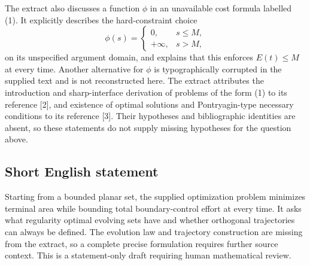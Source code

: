 \documentclass[11pt]{article}
\begin{document}
The extract also discusses a function \(\phi\) in an unavailable cost formula labelled (1). It explicitly describes the hard-constraint choice
\[
\phi(s)=\begin{cases}
0,&s\leq M,\\
+\infty,&s>M,
\end{cases}
\]
on its unspecified argument domain, and explains that this enforces \(E(t)\leq M\) at every time. Another alternative for \(\phi\) is typographically corrupted in the supplied text and is not reconstructed here. The extract attributes the introduction and sharp-interface derivation of problems of the form (1) to its reference [2], and existence of optimal solutions and Pontryagin-type necessary conditions to its reference [3]. Their hypotheses and bibliographic identities are absent, so these statements do not supply missing hypotheses for the question above.
\subsection{Short English statement}
Starting from a bounded planar set, the supplied optimization problem minimizes terminal area while bounding total boundary-control effort at every time. It asks what regularity optimal evolving sets have and whether orthogonal trajectories can always be defined. The evolution law and trajectory construction are missing from the extract, so a complete precise formulation requires further source context. This is a statement-only draft requiring human mathematical review.
\end{document}
